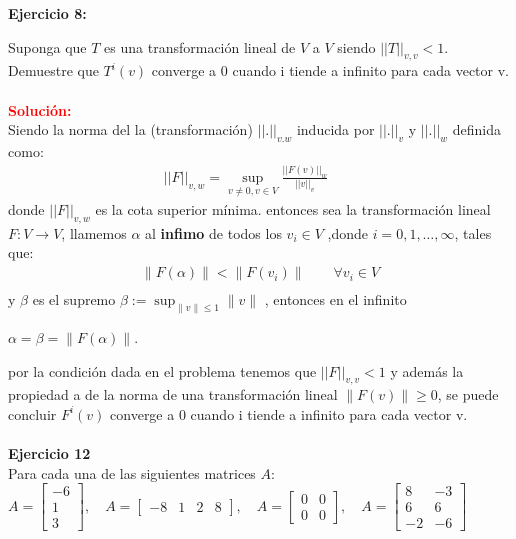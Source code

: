 \documentclass[12pt]{article}
\begin{document}
\noindent \textbf{Ejercicio 8:}

Suponga que $T$ es una transformación lineal de $V$ a $V$ siendo $||T||_{v,v}<  1 $.
Demuestre que $T^{i}( v )$ converge a $0$ cuando i tiende a infinito para cada vector v.\\\\

\noindent \textcolor{red}{\bf Solución:}\\
Siendo la norma del la (transformación) $||.||_{v.w}$ inducida por  $||.||_v$  y $||.||_w$ definida como:\\
\begin{align}
    ||F||_{v,w} = \sup_{v \not= 0, v \in V} \frac{||F(v)||_w}{||v||_v} \qquad 
\end{align}
donde $||F||_{v,w}$ es la cota superior mínima. 
entonces sea la transformación lineal $F:V \rightarrow V$, llamemos $\alpha$ al \textbf{infimo} de todos los $v_i \in V$ ,donde $i=0,1,\ldots, \infty$, tales que:
\begin{align*}
	\parallel F(\alpha)\parallel < \parallel F(v_i) \parallel \qquad \forall v_i \in V \\
\end{align*}
 y $\beta$ es el supremo $\beta := \sup_{\parallel v \parallel \leq 1}{\parallel v \parallel}$ , entonces en el infinito 
\begin{center}
 $\alpha = \beta = \parallel F(\alpha) \parallel$.
\end{center} 
por la condición dada en el problema tenemos que $||F||_{v,v}<  1 $ y además la propiedad	a de la norma de una transformación lineal $\parallel F(v) \parallel \geq 0$, se puede concluir $F^{i}( v )$ converge a $0$ cuando i tiende a infinito para cada vector v.\\\\


\noindent \textbf{Ejercicio 12}\\
Para cada una de las siguientes matrices $A$:\\
$A=\left[\begin{array}{c}
        -6 \\
        1\\
        3
    \end{array}\right]
    , \quad
 A=\left[\begin{array}{cccc}
        -8&1&2&8\end{array}\right],\quad
A=\left[\begin{array}{cc}
        0&0\\
        0&0\end{array}\right],\quad
A=\left[\begin{array}{cc}
        8&-3\\
        6&6\\
        -2&-6\end{array}\right]$\\
        
\end{document}
